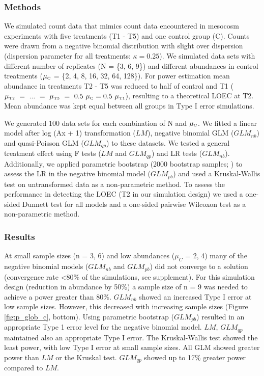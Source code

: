\documentclass{scrartcl}
\begin{document}
\subsubsection{Methods}
We simulated count data that mimics count data encountered in mesocosm experiments with five treatments (T1 - T5) and one control group (C).
Counts were drawn from a negative binomial distribution with slight over dispersion (dispersion parameter for all treatments: $\kappa = 0.25$).
We simulated data sets with different number of replicates (N = \{3, 6, 9\}) and different abundances in control treatments ($\mu_\text{\tiny C}$ = \{2, 4, 8, 16, 32, 64, 128\}). 
For power estimation mean abundance in treatments T2 - T5 was reduced to half of control and T1 ($\mu_\text{\tiny T2}~=~...~=~\mu_\text{\tiny T5}~=~0.5~\mu_\text{\tiny C} = 0.5~\mu_\text{\tiny T1}$), resulting to a theoretical LOEC at T2.
Mean abundance was kept equal between all groups in Type I error simulations.

We generated 100 data sets for each combination of N and $\mu_\text{\tiny C}$. 
We fitted a linear model after log (Ax + 1) transformation ($LM$), negative binomial GLM ($GLM_{nb}$) and quasi-Poisson GLM ($GLM_{qp}$) to these datasets. 
We tested a general treatment effect using F tests ($LM$ and $GLM_{qp}$) and LR tests ($GLM_{nb}$). Additionally, we applied parametric bootstrap (2000 bootstrap samples; \citet{faraway_extending_2006}) to assess the LR in the negative binomial model ($GLM_{pb}$) and used a Kruskal-Wallis test on untransformed data as a non-parametric method.
To assess the performance in detecting the LOEC (T2 in our simulation design) we used a one-sided Dunnett test for all models and a one-sided pairwise Wilcoxon test as a non-parametric method.
 

\subsubsection{Results}
At small sample sizes (n = {3, 6}) and low abundances ($\mu_C$ = {2, 4}) many of the negative binomial models ($GLM_{nb}$ and $GLM_{pb}$) did not converge to a solution (convergence rate \textless 80\% of the simulations, see supplement).  
For this simulation design (reduction in abundance by 50\%) a sample size of n = 9 was needed to achieve a power greater than 80\%.
$GLM_{nb}$ showed an increased Type I error at low sample sizes. 
However, this decreased with increasing sample sizes (Figure \ref{fig:p_glob_c}, bottom).
Using parametric bootstrap ($GLM_{pb}$) resulted in an appropriate Type 1 error level for the negative binomial model.
$LM$, $GLM_{qp}$ maintained also an appropriate Type I error.
The Kruskal-Wallis test showed the least power, with low Type I error at small sample sizes. 
All GLM showed greater power than $LM$ or the Kruskal test. 
$GLM_{qp}$ showed up to 17\% greater power compared to $LM$.
\end{document}
